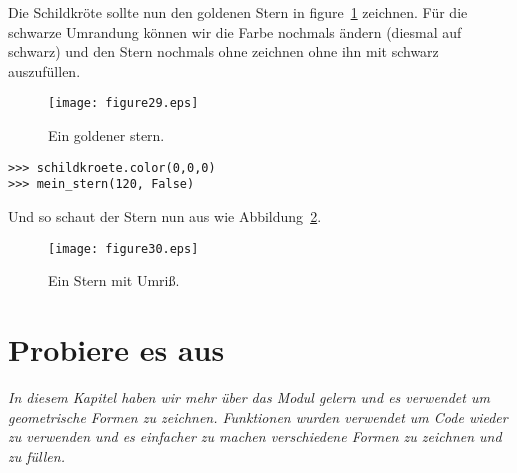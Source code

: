 \noindent
Die Schildkröte sollte nun den goldenen Stern in figure~\ref{fig29} zeichnen. Für die schwarze Umrandung können wir die Farbe nochmals ändern (diesmal auf schwarz) und den Stern nochmals ohne zeichnen ohne ihn mit schwarz auszufüllen.

\begin{figure}
\begin{center}
\texttt{[image: figure29.eps]}
\end{center}
\caption{Ein goldener stern.}\label{fig29}
\end{figure}

\begin{Verbatim}[frame=single]
>>> schildkroete.color(0,0,0)
>>> mein_stern(120, False)
\end{Verbatim}

\noindent
Und so schaut der Stern nun aus wie Abbildung~\ref{fig30}.

\begin{figure}
\begin{center}
\texttt{[image: figure30.eps]}
\end{center}
\caption{Ein Stern mit Umriß.}\label{fig30}
\end{figure}

\section{Probiere es aus}

\emph{In diesem Kapitel haben wir mehr über das  Modul gelern und es verwendet um geometrische Formen zu zeichnen. Funktionen wurden verwendet um Code wieder zu verwenden und es einfacher zu machen verschiedene Formen zu zeichnen und zu füllen.}

